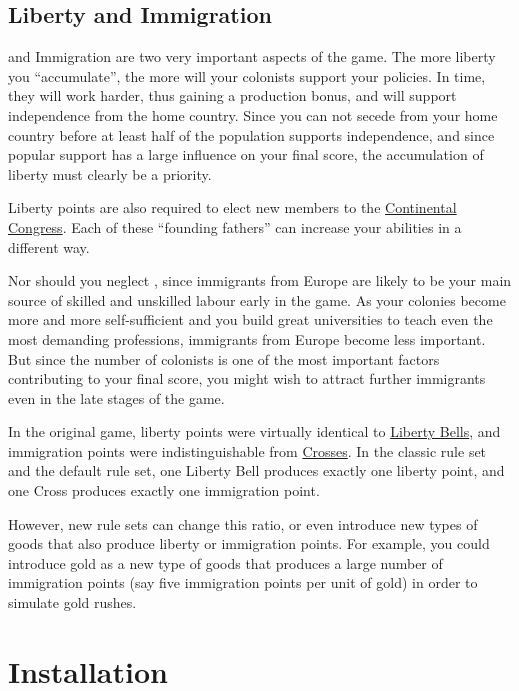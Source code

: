 \documentclass[12pt]{book}
\begin{document}
\hypertarget{Liberty and Immigration}{\section{Liberty and Immigration}}

 and Immigration are two very important aspects of
the game. The more liberty you ``accumulate'', the more will your
colonists support your policies. In time, they will work harder, thus
gaining a production bonus, and will support independence from the
home country. Since you can not secede from your home country before
at least half of the population supports independence, and since
popular support has a large influence on your final score, the
accumulation of liberty must clearly be a priority.

Liberty points are also required to elect new members to the
\hyperlink{Continental Congress}{Continental Congress}. Each of these
``founding fathers'' can increase your abilities in a different way.

Nor should you neglect , since immigrants from
Europe are likely to be your main source of skilled and unskilled
labour early in the game. As your colonies become more and more
self-sufficient and you build great universities to teach even the
most demanding professions, immigrants from Europe become less
important. But since the number of colonists is one of the most
important factors contributing to your final score, you might wish to
attract further immigrants even in the late stages of the game.

In the original game, liberty points were virtually identical to
\hyperlink{Liberty Bells}{Liberty Bells}, and immigration points were
indistinguishable from \hyperlink{Crosses}{Crosses}. In the classic
rule set and the default rule set, one Liberty Bell produces exactly
one liberty point, and one Cross produces exactly one immigration
point.

However, new rule sets can change this ratio, or even introduce new
types of goods that also produce liberty or immigration points. For
example, you could introduce gold as a new type of goods that produces
a large number of immigration points (say five immigration points per
unit of gold) in order to simulate gold rushes.



\hypertarget{Installation}{\chapter{Installation}}
\end{document}
